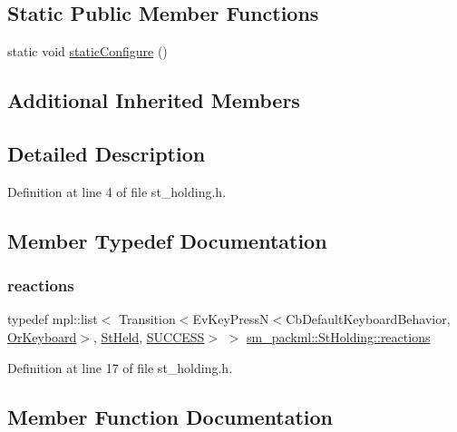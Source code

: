 \subsection*{Static Public Member Functions}
\begin{DoxyCompactItemize}
\item 
static void \hyperlink{structsm__packml_1_1StHolding_a22319b4c87a56cbaa2e3baefd6c2f035}{static\+Configure} ()
\end{DoxyCompactItemize}
\subsection*{Additional Inherited Members}


\subsection{Detailed Description}


Definition at line 4 of file st\+\_\+holding.\+h.



\subsection{Member Typedef Documentation}
\mbox{\label{structsm__packml_1_1StHolding_af6f29cea0ce7bbcc1b4b9faf61809791}} 
\subsubsection{\texorpdfstring{reactions}{reactions}}
{\footnotesize\ttfamily typedef mpl\+::list$<$ Transition$<$Ev\+Key\+PressN$<$Cb\+Default\+Keyboard\+Behavior, \hyperlink{classsm__packml_1_1OrKeyboard}{Or\+Keyboard}$>$, \hyperlink{structsm__packml_1_1StHeld}{St\+Held}, \hyperlink{classSUCCESS}{S\+U\+C\+C\+E\+SS}$>$ $>$ \hyperlink{structsm__packml_1_1StHolding_af6f29cea0ce7bbcc1b4b9faf61809791}{sm\+\_\+packml\+::\+St\+Holding\+::reactions}}



Definition at line 17 of file st\+\_\+holding.\+h.



\subsection{Member Function Documentation}
\mbox{\label{structsm__packml_1_1StHolding_a3f27c013788233885fcd2566ff679877}} 
